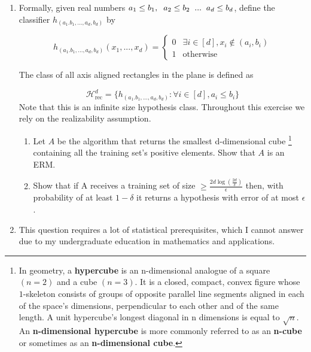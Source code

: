 \documentclass[]{book}
\theoremstyle{definition}
\begin{document}
\begin{enumerate}
    
    
    
    
    
    
    
    
    
    
    \item Formally, given real numbers $a_1 \leq b_1, \hspace{0.2 cm} a_2 \leq b_2 \hspace{0.2 cm} ... \hspace{0.2 cm} a_d \leq b_d $, define the classifier $h_{(a_1.b_1,...,a_d,b_d)}$ by

\begin{equation*}
  h_{(a_1.b_1,...,a_d,b_d)}(x_1,...,x_d)= \left\{\begin{matrix}
0 & \exists i \in [d] , x_i \notin (a_i,b_i)  \\ 
1 & \text{otherwise}
\end{matrix}\right. 
\end{equation*}

The class of all axis aligned rectangles in the plane is defined as

\begin{equation*}
    \mathcal{H}_{\text{rec}}^d=\{ h_{(a_1.b_1,...,a_d,b_d)}:\forall i \in [d],a_i \leq b_i\}
\end{equation*}
    Note that this is an infinite size hypothesis class. Throughout this exercise we rely
on the realizability assumption.
 
 \begin{enumerate}[I]
  \item Let $A$ be the algorithm that returns the smallest d-dimensional cube
  \footnote{In geometry, a \textbf{hypercube} is an n-dimensional analogue of a square $(n = 2)$ and a cube $(n = 3)$. It is a closed, compact, convex figure whose $1$-skeleton consists of groups of opposite parallel line segments aligned in each of the space's dimensions, perpendicular to each other and of the same length. A unit hypercube's longest diagonal in n dimensions is equal to ${ {\sqrt {n}}.}$
  An \textbf{n-dimensional hypercube} is more commonly referred to as an \textbf{n-cube} or sometimes as an \textbf{n-dimensional cube}.
  }
 containing all the training set's positive elements. Show that $A$ is an ERM.
  
  
  \item Show that if A receives a training set of size $\geq \frac{2d \log (\frac{2d}{\delta}) }{\epsilon}$ then, with probability of at least $1-\delta$ it returns a hypothesis with error of at most $\epsilon$ .
  
\end{enumerate}

\item This question requires a lot of statistical prerequisites, which I cannot answer due to my undergraduate education in mathematics and applications.
\end{enumerate}
\end{document}

